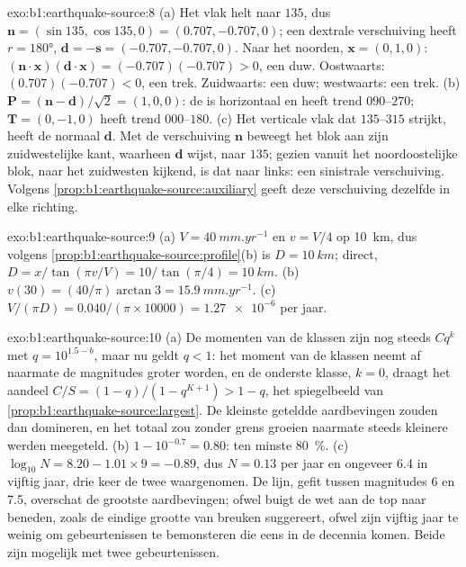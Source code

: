 \begin{solution}{exo:b1:earthquake-source:8}
(a) Het vlak helt naar $135$, dus $\mathbf n = (\sin135, \cos135, 0) =
(0.707, -0.707, 0)$; een dextrale verschuiving heeft $r = \ang{180}$, $\mathbf d = -\mathbf s
= (-0.707, -0.707, 0)$. Naar het noorden, $\mathbf x = (0, 1, 0)$:
$(\mathbf n\cdot\mathbf x)(\mathbf d\cdot\mathbf x) = (-0.707)(-0.707) > 0$, een
duw. Oostwaarts: $(0.707)(-0.707) < 0$, een trek. Zuidwaarts: een duw; westwaarts: een trek.
(b) $\mathbf P = (\mathbf n - \mathbf d)/\sqrt2 = (1, 0, 0)$: de  is horizontaal en
heeft trend $090$--$270$; $\mathbf T = (0, -1, 0)$ heeft trend $000$--$180$. (c) Het
verticale vlak dat $135$--$315$ strijkt, heeft de normaal $\mathbf d$. Met de
verschuiving $\mathbf n$ beweegt het blok aan zijn zuidwestelijke kant, waarheen
$\mathbf d$ wijst, naar $135$; gezien vanuit het noordoostelijke blok, naar het
zuidwesten kijkend, is dat naar links: een sinistrale verschuiving. Volgens
\cref{prop:b1:earthquake-source:auxiliary} geeft deze verschuiving dezelfde  in elke richting.
\end{solution}

\begin{solution}{exo:b1:earthquake-source:9}
(a) $V = \qty{40}{mm.yr^{-1}}$ en $v = V/4$ op \qty{10}{km}, dus volgens
\cref{prop:b1:earthquake-source:profile}(b) is $D = \qty{10}{km}$; direct,
$D = x/\tan(\pi v/V) = 10/\tan(\pi/4) = \qty{10}{km}$. (b) $v(30) =
(40/\pi)\arctan 3 = \qty{15.9}{mm.yr^{-1}}$. (c) $V/(\pi D) =
\num{0.040}/(\pi\times\num{10000}) = \num{1.27e-6}$ per jaar.
\end{solution}

\begin{solution}{exo:b1:earthquake-source:10}
(a) De momenten van de klassen zijn nog steeds $C q^k$ met $q = 10^{1.5 - b}$, maar nu
geldt $q < 1$: het moment van de klassen neemt af naarmate de magnitudes groter worden,
en de onderste klasse, $k = 0$, draagt het aandeel $C/S = (1 - q)/(1 - q^{K+1}) > 1 - q$,
het spiegelbeeld van \cref{prop:b1:earthquake-source:largest}. De kleinste geteldde
aardbevingen zouden dan domineren, en het totaal zou zonder grens groeien naarmate steeds
kleinere werden meegeteld. (b) $1 - 10^{-0.7} = 0.80$: ten minste \qty{80}{\percent}.
(c) $\log_{10}N = 8.20 - 1.01\times9 = -0.89$, dus $N = 0.13$ per jaar en ongeveer 6.4
in vijftig jaar, drie keer de twee waargenomen. De lijn, gefit tussen magnitudes 6 en
7.5, overschat de grootste aardbevingen; ofwel buigt de wet aan de top naar beneden, zoals
de eindige grootte van breuken suggereert, ofwel zijn vijftig jaar te weinig om
gebeurtenissen te bemonsteren die eens in de decennia komen. Beide zijn mogelijk met twee
gebeurtenissen.
\end{solution}

